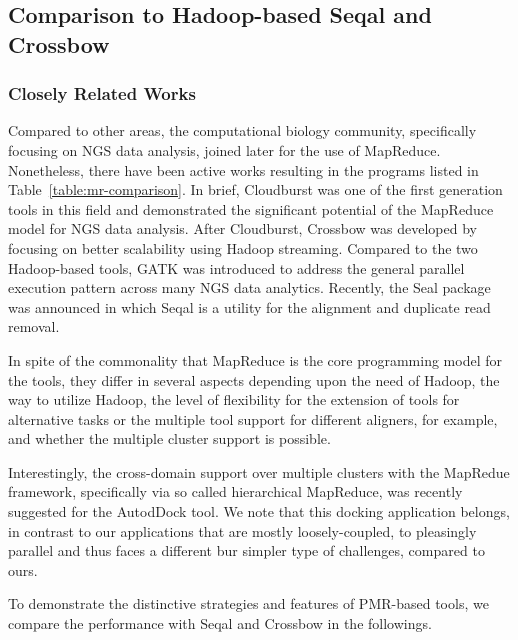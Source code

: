 \documentclass{acm_proc_article-sp}
\begin{document}
\subsection{Comparison to Hadoop-based Seqal and Crossbow}
\subsubsection{Closely Related Works}
Compared to other areas, the computational biology community, specifically focusing on NGS data analysis, joined later for the use of MapReduce\cite{cloudburst}.  Nonetheless, there have been active works resulting in the programs listed in Table~\ref{table:mr-comparison}.  In brief, Cloudburst was one of the first generation tools in this field and  demonstrated the significant potential of the MapReduce model for NGS data analysis.  After Cloudburst, Crossbow was developed by focusing on better scalability using Hadoop streaming.  Compared to the two Hadoop-based tools, GATK was introduced to address the general parallel execution pattern across many NGS data analytics.  Recently, the Seal package was announced in which Seqal is a utility for the alignment and duplicate read removal.   

In spite of the commonality that MapReduce is the core programming model for the tools, they differ in several aspects depending upon the need of Hadoop, the way to utilize Hadoop, the level of flexibility for the extension of tools for alternative tasks or the multiple tool support for different aligners, for example, and whether the multiple cluster support is possible.

Interestingly, the cross-domain support over multiple clusters with the MapRedue framework, specifically via so called hierarchical MapReduce, was recently suggested for the AutodDock tool.  We note that this docking application belongs, in contrast to our applications that are mostly loosely-coupled, to pleasingly parallel and thus faces a different bur simpler type of challenges, compared to ours\cite{ecmls11-mr-autodock}.

To demonstrate the distinctive strategies and features of PMR-based tools, we compare the performance with Seqal and Crossbow in the followings.  
\end{document}
